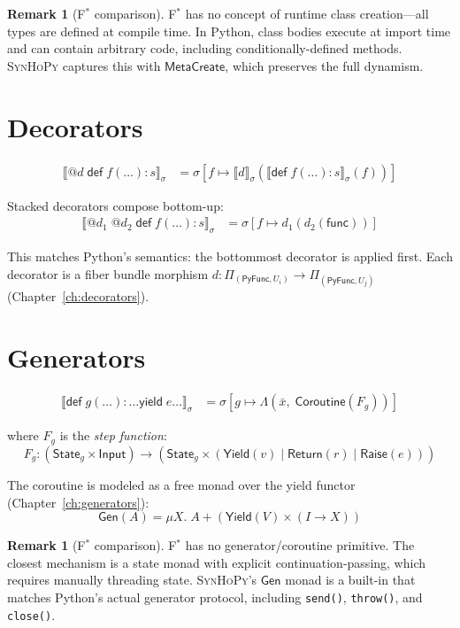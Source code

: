 \documentclass[11pt,a4paper]{report}
\theoremstyle{definition}
\newtheorem{remark}[definition]{Remark}
\theoremstyle{plain}
\newcommand{\den}[1]{\llbracket #1 \rrbracket}
\newcommand{\PyFunc}{\mathsf{PyFunc}}
\newcommand{\fstar}{F$^{*}$}
\newcommand{\synhopy}{\textsc{SynHoPy}}
\begin{document}
\begin{remark}[\fstar{} comparison]
\fstar{} has no concept of runtime class creation---all types are defined at
compile time.  In Python, class bodies execute at import time and can contain
arbitrary code, including conditionally-defined methods.  \synhopy{} captures
this with $\mathsf{MetaCreate}$, which preserves the full dynamism.
\end{remark}

\section{Decorators}

\begin{align}
  \den{\texttt{@}d\;\mathsf{def}\;f(\ldots):s}_\sigma
    &= \sigma\!\left[f \mapsto \den{d}_\sigma(\den{\mathsf{def}\;f(\ldots):s}_\sigma(f))\right]
\end{align}

Stacked decorators compose bottom-up:
\begin{align}
  \den{\texttt{@}d_1\;\texttt{@}d_2\;\mathsf{def}\;f(\ldots):s}_\sigma
    &= \sigma[f \mapsto d_1(d_2(\mathsf{func}))]
\end{align}

This matches Python's semantics: the bottommost decorator is applied first.
Each decorator is a fiber bundle morphism
$d : \Pi_{(\PyFunc, U_i)} \to \Pi_{(\PyFunc, U_j)}$ (Chapter~\ref{ch:decorators}).

\section{Generators}

\begin{align}
  \den{\mathsf{def}\;g(\ldots):\ldots\mathsf{yield}\;e\ldots}_\sigma
    &= \sigma\!\left[g \mapsto \Lambda(\bar{x},\; \mathsf{Coroutine}(F_g))\right]
\end{align}

where $F_g$ is the \emph{step function}:
\[
  F_g : (\mathsf{State}_g \times \mathsf{Input}) \to
    (\mathsf{State}_g \times (\mathsf{Yield}(v) \mid \mathsf{Return}(r) \mid
      \mathsf{Raise}(e)))
\]

The coroutine is modeled as a free monad over the yield functor
(Chapter~\ref{ch:generators}):
\[
  \mathsf{Gen}(A) = \mu X.\; A + (\mathsf{Yield}(V) \times (I \to X))
\]

\begin{remark}[\fstar{} comparison]
\fstar{} has no generator/coroutine primitive.  The closest mechanism is a
state monad with explicit continuation-passing, which requires manually
threading state.  \synhopy{}'s $\mathsf{Gen}$ monad is a built-in that matches
Python's actual generator protocol, including \texttt{send()}, \texttt{throw()},
and \texttt{close()}.
\end{remark}
\end{document}
